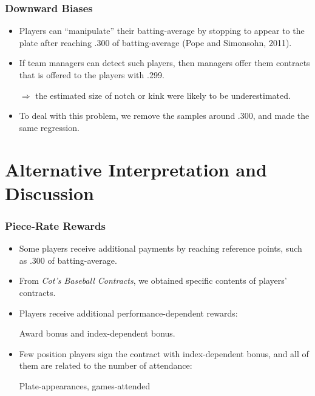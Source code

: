 \documentclass[dvipdfmx,12pt]{beamer}
\begin{document}
\begin{frame}
  
\end{frame}

\begin{frame}\frametitle{Downward Biases}
  \begin{itemize}
    \item Players can ``manipulate'' their batting-average by stopping to appear to the plate after reaching .300 of batting-average (Pope and Simonsohn, 2011).

    \item If team managers can detect such players, then managers offer them contracts that is offered to the players with .299.

    $\Rightarrow$ the estimated size of notch or kink were likely to be underestimated.

    \item To deal with this problem, we remove the samples around .300, and made the same regression.
  \end{itemize}
\end{frame}

\begin{frame}
  
\end{frame}


\section*{Alternative Interpretation and Discussion}

\begin{frame}\frametitle{Piece-Rate Rewards}
  \begin{itemize}
    \item Some players receive additional payments by reaching reference points, such as .300 of batting-average.

    \item From \textit{Cot's Baseball Contracts}, we obtained specific contents of players' contracts.

    \item Players receive additional performance-dependent rewards:

    Award bonus and index-dependent bonus.

    \item Few position players sign the contract with index-dependent bonus, and all of them are related to the number of attendance:

    Plate-appearances, games-attended
  \end{itemize}
\end{frame}
\end{document}
